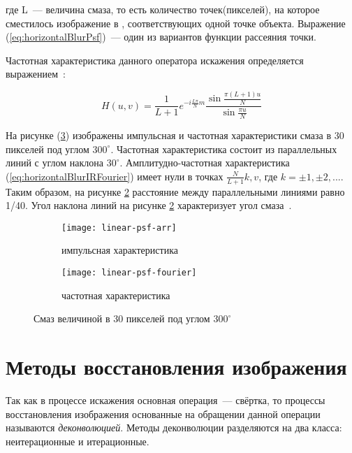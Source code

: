 где L~--- величина смаза, то есть количество точек(пикселей), на которое сместилось изображение в , соответствующих одной точке объекта. Выражение (\ref{eq:horizontalBlurPsf})~--- один из вариантов функции рассеяния точки.

Частотная характеристика данного оператора искажения определяется выражением~\cite{iterableImageRestorationBiemonLangdeik}:

\begin{equation}\label{eq:horizontalBlurIRFourier}
H(u,v) =       
	\frac{1}{L+1}e^{-i\frac{L\pi}{N}m}\frac{\sin\frac{\pi(L+1)u}{N}}{\sin\frac{\pi u}{N}}
\end{equation}

На рисунке (\ref{fig:linearPsf}) изображены импульсная и частотная характеристики смаза в 30 пикселей под углом $300^\circ$. Частотная характеристика состоит из параллельных линий с углом наклона $30^\circ$. Амплитудно-частотная характеристика (\ref{eq:horizontalBlurIRFourier}) имеет нули в точках $\frac{N}{L+1}k, v$, где $k = \pm 1, \pm2, ...$. Таким образом, на рисунке \ref{fig:linearPsfFourier} расстояние между параллельными линиями равно 1/40. Угол наклона линий на рисунке \ref{fig:linearPsfFourier} характеризует угол смаза~\cite{iterableImageRestorationBiemonLangdeik}.
\begin{figure}[h!]
	\begin{subfigure}[b]{0.5\textwidth}
		\texttt{[image: linear-psf-arr]}
		\caption{импульсная характеристика}
		\label{fig:linearPsfArr}
	\end{subfigure}%
	\begin{subfigure}[b]{0.5\textwidth}
		\texttt{[image: linear-psf-fourier]}%
		\caption{частотная характеристика}
		\label{fig:linearPsfFourier}
	\end{subfigure}%
	\caption{Смаз величиной в 30 пикселей под углом $300^{\circ}$}\label{fig:linearPsf}
\end{figure}

\section{Методы восстановления изображения}
Так как в процессе искажения основная операция~--- свёртка, то процессы восстановления изображения основанные на обращении данной операции называются \textit{деконволюцией}. Методы деконволюции разделяются на два класса: неитерационные и итерационные.

